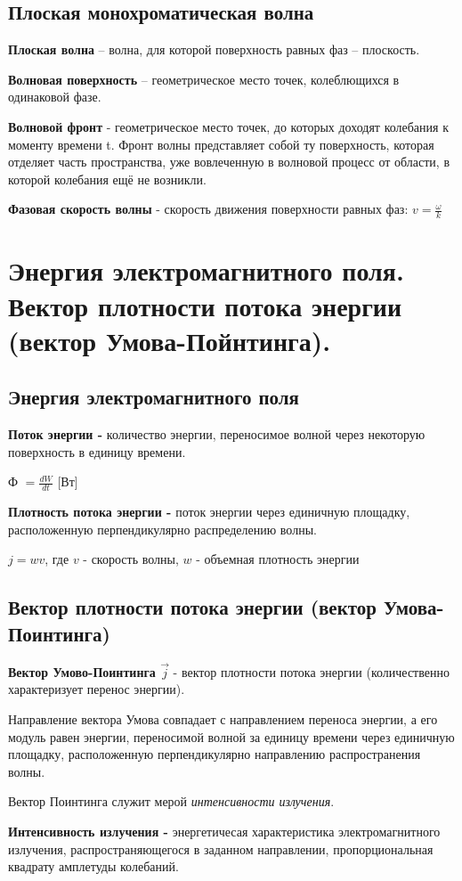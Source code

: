 \documentclass[12pt]{report}
\begin{document}
\subsection{Плоская монохроматическая волна}
\textbf{Плоская волна} – волна, для которой поверхность равных фаз – плоскость.

\textbf{Волновая поверхность} – геометрическое место точек, колеблющихся в одинаковой фазе.

\textbf{Волновой фронт} - геометрическое место точек, до которых доходят колебания к моменту времени t. Фронт волны представляет собой ту поверхность, которая отделяет часть пространства, уже вовлеченную в волновой процесс от области, в которой колебания ещё не возникли.

\textbf{Фазовая скорость волны } - скорость движения поверхности равных фаз:
$v = \frac{\omega}{k}$


\section{Энергия электромагнитного поля. Вектор плотности потока энергии (вектор Умова-Пойнтинга).}
\subsection{Энергия электромагнитного поля}
\textbf{Поток энергии - } количество энергии, переносимое волной через некоторую поверхность в единицу времени.\par
Ф $= \frac{dW}{dt}$ [Вт]\par
\textbf{Плотность потока энергии -} поток энергии через единичную площадку, расположенную перпендикулярно распределению волны.\par
$j = w v$, где $v$ - скорость волны, $w$ - объемная плотность энергии\par

\subsection{Вектор плотности потока энергии (вектор Умова-Поинтинга)}
\textbf{Вектор Умово-Поинтинга $\vec {j}$} - вектор плотности потока энергии (количественно характеризует перенос энергии). \par
Направление вектора Умова совпадает с направлением переноса энергии, а его модуль равен энергии, переносимой волной за единицу времени через единичную площадку, расположенную перпендикулярно направлению распространения волны.\par
Вектор Поинтинга служит мерой \textit{интенсивности излучения}.\par
\textbf{Интенсивность излучения -} энергетичесая характеристика электромагнитного излучения, распространяющегося в заданном направлении, пропорциональная квадрату амплетуды колебаний.\par
\end{document}
